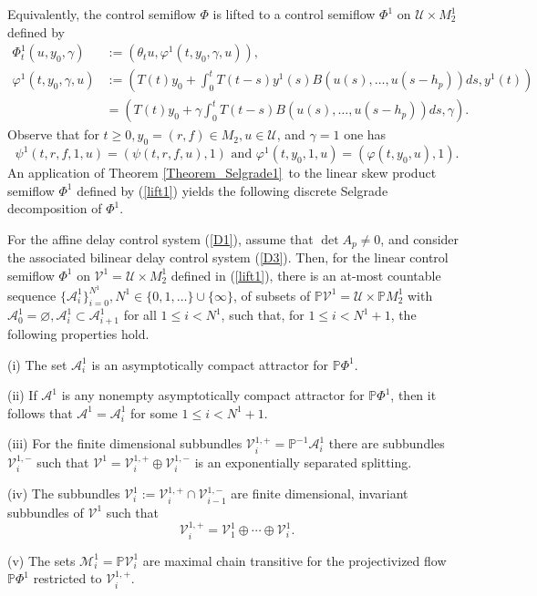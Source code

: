 \documentclass{siamltex}%
\begin{document}
Equivalently, the control semiflow $\Phi$ is lifted to a control semiflow
$\Phi^{1}$ on $\mathcal{U}\times M_{2}^{1}$ defined by%
\begin{align}
\Phi_{t}^{1}(u,y_{0},\gamma)  &  :=(\theta_{t}u,\varphi^{1}(t,y_{0}%
,\gamma,u)),\label{lift1}\\
\varphi^{1}(t,y_{0},\gamma,u)  &  :=\left(  T(t)y_{0}+\int_{0}^{t}%
T(t-s)y^{1}(s)B\left(  u(s),\ldots,u(s-h_{p})\right)  ds,y^{1}(t)\right)
\nonumber\\
&  =\left(  T(t)y_{0}+\gamma\int_{0}^{t}T(t-s)B\left(  u(s),\ldots
,u(s-h_{p})\right)  ds,\gamma\right)  .\nonumber
\end{align}
Observe that for $t\geq0,y_{0}=(r,f)\in M_{2},u\in\mathcal{U}$, and $\gamma=1$
one has
\[
\psi^{1}(t,r,f,1,u)=(\psi(t,r,f,u),1)\text{ and }\varphi^{1}(t,y_{0}%
,1,u)=(\varphi(t,y_{0},u),1).
\]
An application of Theorem \ref{Theorem_Selgrade1}\ to the linear skew product
semiflow $\Phi^{1}$ defined by (\ref{lift1}) yields the following discrete
Selgrade decomposition of $\Phi^{1}$.

\begin{theorem}
\label{Theorem_Selgrade2}For the affine delay control system (\ref{D1}),
assume that $\det A_{p}\not =0$, and consider the associated bilinear delay
control system (\ref{D3}). Then, for the linear control semiflow $\Phi^{1}$ on
$\mathcal{V}^{1}=\mathcal{U}\times M_{2}^{1}$ defined in (\ref{lift1}), there
is an at-most countable sequence $\{\mathcal{A}_{i}^{1}\}_{i=0}^{N^{1}%
},\allowbreak N^{1}\in\{0,1,\ldots\}\cup\{\infty\}$, of subsets of
$\mathbb{P}\mathcal{V}^{1}=\mathcal{U}\times\mathbb{P}M_{2}^{1}$ with
$\mathcal{A}_{0}^{1}=\varnothing,\mathcal{A}_{i}^{1}\subset\mathcal{A}%
_{i+1}^{1}$ for all $1\leq i<N^{1}$, such that, for $1\leq i<N^{1}+1$, the
following properties hold.

(i) The set $\mathcal{A}_{i}^{1}$ is an asymptotically compact attractor for
$\mathbb{P}\Phi^{1}$.

(ii) If $\mathcal{A}^{1}$ is any nonempty asymptotically compact attractor for
$\mathbb{P}\Phi^{1}$, then it follows that $\mathcal{A}^{1}=\mathcal{A}%
_{i}^{1}$ for some $1\leq i<N^{1}+1$.

(iii) For the finite dimensional subbundles $\mathcal{V}_{i}^{1,+}%
=\mathbb{P}^{-1}\mathcal{A}_{i}^{1}$ there are subbundles $\mathcal{V}%
_{i}^{1,-}$ such that $\mathcal{V}^{1}=\mathcal{V}_{i}^{1,+}\oplus
\mathcal{V}_{i}^{1,-}$ is an exponentially separated splitting.

(iv) The subbundles $\mathcal{V}_{i}^{1}:=\mathcal{V}_{i}^{1,+}\cap
\mathcal{V}_{i-1}^{1,-}$ are finite dimensional, invariant subbundles of
$\mathcal{V}^{1}$ such that%
\[
\mathcal{V}_{i}^{1,+}=\mathcal{V}_{1}^{1}\oplus\cdots\oplus\mathcal{V}_{i}%
^{1}.
\]


(v) The sets $\mathcal{M}_{i}^{1}=\mathbb{P}\mathcal{V}_{i}^{1}$ are maximal
chain transitive for the projectivized flow $\mathbb{P}\Phi^{1}$ restricted to
$\mathcal{V}_{i}^{1,+}$.
\end{theorem}
\end{document}
